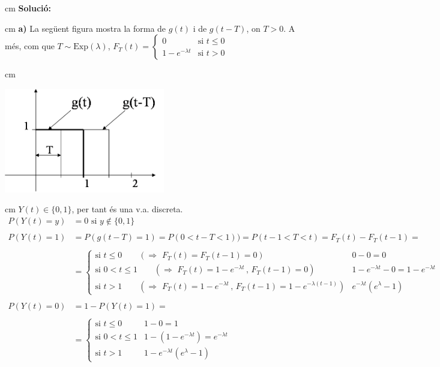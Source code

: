 \documentclass{article}
\begin{document}
 cm
\noindent
\textbf{Soluci\'o:}

 cm
\noindent
\textbf{a)} La seg\"uent figura mostra la forma de $g(t)$ i de $g(t-T)$,
on $T > 0$. A m\'es, com que $T \sim \mathrm{Exp}(\lambda)$,  
$F_T(t)=\begin{cases} 0 & \text{si } t \leq 0 \\ 1-e^{-\lambda t} & \text{si } t > 0  \end{cases}$

 cm
\begin{center}
\includegraphics[width=7cm]{figprob4T3.png}
\end{center}

 cm
$Y(t) \in \{0, 1\}$, per tant \'es una v.a. discreta. 
\[
\begin{array}{ll}
P(Y(t)=y)& = 0 \text{ si } y \notin \{0, 1 \} 
\\ \\
P(Y(t)=1)& = P(g(t-T)=1)=P(0 < t-T < 1))=P(t-1 < T < t) = F_T(t)-F_T(t-1)=\\ \\        
         & = \begin{cases} 
\text{si } t \leq 0 \qquad (\Rightarrow \,\, F_T(t)=F_T(t-1)=0) & 0-0=0 \\
\text{si } 0 < t \leq 1 \qquad (\Rightarrow \,\, F_T(t)=1-e^{-\lambda t}\, , \, F_T(t-1)=0) & 
1-e^{-\lambda t}-0=1-e^{-\lambda t} \\
\text{si } t > 1 \qquad (\Rightarrow \,\, F_T(t)=1-e^{-\lambda t}\, , \, F_T(t-1)=1-e^{-\lambda (t-1)}) &
 e^{-\lambda t} (e^\lambda -1)
\end{cases}
\\ \\
P(Y(t)=0)& = 1-P(Y(t)=1)= \\ \\
         & = \begin{cases} 
             \text{si } t \leq 0 & 1-0=1 \\
             \text{si } 0 < t \leq 1 & 1-(1-e^{-\lambda t})=e^{-\lambda t} \\
             \text{si } t > 1 & 1-e^{-\lambda t} (e^\lambda -1) 
             \end{cases}
\end{array}
\]
\end{document}
